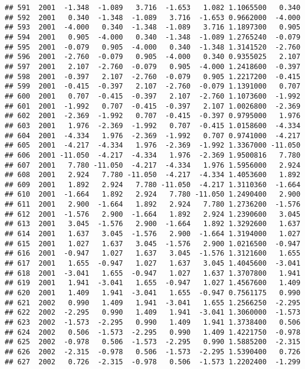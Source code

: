 \documentclass[]{article}
\begin{document}
\begin{verbatim}
## 591  2001  -1.348  -1.089   3.716  -1.653   1.082 1.1065500   0.340
## 592  2001   0.340  -1.348  -1.089   3.716  -1.653 0.9662000  -4.000
## 593  2001  -4.000   0.340  -1.348  -1.089   3.716 1.1897300   0.905
## 594  2001   0.905  -4.000   0.340  -1.348  -1.089 1.2765240  -0.079
## 595  2001  -0.079   0.905  -4.000   0.340  -1.348 1.3141520  -2.760
## 596  2001  -2.760  -0.079   0.905  -4.000   0.340 0.9355025   2.107
## 597  2001   2.107  -2.760  -0.079   0.905  -4.000 1.2418600  -0.397
## 598  2001  -0.397   2.107  -2.760  -0.079   0.905 1.2217200  -0.415
## 599  2001  -0.415  -0.397   2.107  -2.760  -0.079 1.1391000   0.707
## 600  2001   0.707  -0.415  -0.397   2.107  -2.760 1.1073600  -1.992
## 601  2001  -1.992   0.707  -0.415  -0.397   2.107 1.0026800  -2.369
## 602  2001  -2.369  -1.992   0.707  -0.415  -0.397 0.9795000   1.976
## 603  2001   1.976  -2.369  -1.992   0.707  -0.415 1.0158600  -4.334
## 604  2001  -4.334   1.976  -2.369  -1.992   0.707 0.9741000  -4.217
## 605  2001  -4.217  -4.334   1.976  -2.369  -1.992 1.3367000 -11.050
## 606  2001 -11.050  -4.217  -4.334   1.976  -2.369 1.9500816   7.780
## 607  2001   7.780 -11.050  -4.217  -4.334   1.976 1.5956000   2.924
## 608  2001   2.924   7.780 -11.050  -4.217  -4.334 1.4053600   1.892
## 609  2001   1.892   2.924   7.780 -11.050  -4.217 1.3110360  -1.664
## 610  2001  -1.664   1.892   2.924   7.780 -11.050 1.2490400   2.900
## 611  2001   2.900  -1.664   1.892   2.924   7.780 1.2736200  -1.576
## 612  2001  -1.576   2.900  -1.664   1.892   2.924 1.2390600   3.045
## 613  2001   3.045  -1.576   2.900  -1.664   1.892 1.3292600   1.637
## 614  2001   1.637   3.045  -1.576   2.900  -1.664 1.3194000   1.027
## 615  2001   1.027   1.637   3.045  -1.576   2.900 1.0216500  -0.947
## 616  2001  -0.947   1.027   1.637   3.045  -1.576 1.3121600   1.655
## 617  2001   1.655  -0.947   1.027   1.637   3.045 1.4045600  -3.041
## 618  2001  -3.041   1.655  -0.947   1.027   1.637 1.3707800   1.941
## 619  2001   1.941  -3.041   1.655  -0.947   1.027 1.4567600   1.409
## 620  2001   1.409   1.941  -3.041   1.655  -0.947 0.7561175   0.990
## 621  2002   0.990   1.409   1.941  -3.041   1.655 1.2566250  -2.295
## 622  2002  -2.295   0.990   1.409   1.941  -3.041 1.3060000  -1.573
## 623  2002  -1.573  -2.295   0.990   1.409   1.941 1.3738400   0.506
## 624  2002   0.506  -1.573  -2.295   0.990   1.409 1.4221750  -0.978
## 625  2002  -0.978   0.506  -1.573  -2.295   0.990 1.5885200  -2.315
## 626  2002  -2.315  -0.978   0.506  -1.573  -2.295 1.5390400   0.726
## 627  2002   0.726  -2.315  -0.978   0.506  -1.573 1.2202400  -1.299

\end{verbatim}
\end{document}

